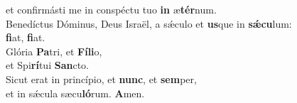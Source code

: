 \oddverse et confirmásti me in conspéctu tuo \textbf{in} æ\textbf{tér}num.\\
\evenverse Benedíctus Dóminus, Deus Israël, a sǽculo et \textbf{us}que in \textbf{sǽ}\textbf{cu}lum:~\*\\
\evenverse \textbf{fi}at, \textbf{fi}at.\\
\oddverse Glória \textbf{Pa}tri, et \textbf{Fí}\textbf{li}o,~\*\\
\oddverse et Spi\textbf{rí}tui \textbf{San}cto.\\
\evenverse Sicut erat in princípio, et \textbf{nunc}, et \textbf{sem}per,~\*\\
\evenverse et in sǽcula sæcu\textbf{ló}rum. \textbf{A}men.\\
